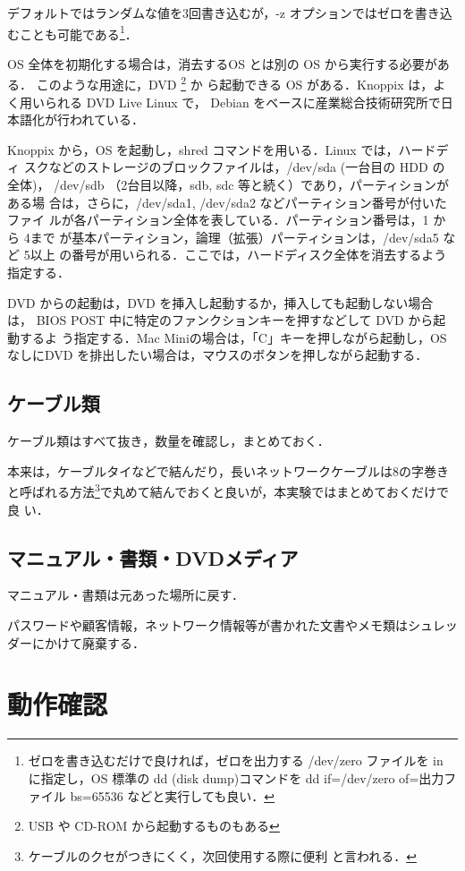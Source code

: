 デフォルトではランダムな値を3回書き込むが，-z オプションではゼロを書き込
むことも可能である\footnote{ゼロを書き込むだけで良ければ，ゼロを出力する
/dev/zero ファイルを in に指定し，OS 標準の dd (disk dump)コマンドを dd
if=/dev/zero of=出力ファイル bs=65536 などと実行しても良い．}．

OS 全体を初期化する場合は，消去するOS とは別の OS から実行する必要がある．
このような用途に，DVD \footnote{USB や CD-ROM から起動するものもある} か
ら起動できる OS がある．Knoppix は，よく用いられる DVD Live Linux で，
Debian をベースに産業総合技術研究所で日本語化が行われている．

Knoppix から，OS を起動し，shred コマンドを用いる．Linux では，ハードディ
スクなどのストレージのブロックファイルは，/dev/sda (一台目の HDD の 全体)，
/dev/sdb （2台目以降，sdb, sdc 等と続く）であり，パーティションがある場
合は，さらに，/dev/sda1, /dev/sda2 などパーティション番号が付いたファイ
ルが各パーティション全体を表している．パーティション番号は，1 から 4まで
が基本パーティション，論理（拡張）パーティションは，/dev/sda5 など 5以上
の番号が用いられる．ここでは，ハードディスク全体を消去するよう指定する．

DVD からの起動は，DVD を挿入し起動するか，挿入しても起動しない場合は，
BIOS POST 中に特定のファンクションキーを押すなどして DVD から起動するよ
う指定する．Mac Miniの場合は，「C」キーを押しながら起動し，OS なしにDVD 
を排出したい場合は，マウスのボタンを押しながら起動する．

\subsection*{ケーブル類}

ケーブル類はすべて抜き，数量を確認し，まとめておく．

本来は，ケーブルタイなどで結んだり，長いネットワークケーブルは8の字巻き
と呼ばれる方法\footnote{ケーブルのクセがつきにくく，次回使用する際に便利
と言われる．}で丸めて結んでおくと良いが，本実験ではまとめておくだけで良
い．

\subsection*{マニュアル・書類・DVDメディア}

マニュアル・書類は元あった場所に戻す．

パスワードや顧客情報，ネットワーク情報等が書かれた文書やメモ類はシュレッ
ダーにかけて廃棄する．


\section{動作確認}

